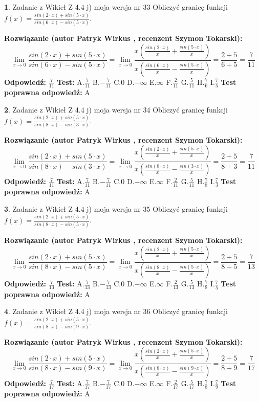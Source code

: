 \documentclass[12pt, a4paper]{article}
\theoremstyle{definition} %
\newtheorem{zad}{}
\newcommand{\zadStart}[1]{\begin{zad}#1\newline}
\newcommand{\zadStop}{\end{zad}}
\newcommand{\rozwStart}[2]{\noindent \textbf{Rozwiązanie (autor #1 , recenzent #2): }\newline}
\newcommand{\rozwStop}{\newline}
\newcommand{\odpStart}{\noindent \textbf{Odpowiedź:}\newline}
\newcommand{\odpStop}{\newline}
\newcommand{\testStart}{\noindent \textbf{Test:}\newline}
\newcommand{\testStop}{\newline}
\newcommand{\kluczStart}{\noindent \textbf{Test poprawna odpowiedź:}\newline}
\newcommand{\kluczStop}{\newline}
\begin{document}
\zadStart{Zadanie z Wikieł Z 4.4 j) moja wersja nr 33}
Obliczyć granicę funkcji $f(x)=\frac{sin(2\cdot x) +sin(5\cdot x)}{sin(6\cdot x) -sin(5\cdot x)}$.
\zadStop
\rozwStart{Patryk Wirkus}{Szymon Tokarski}
$$\lim\limits_{x\to 0}\frac{sin(2\cdot x) +sin(5\cdot x)}{sin(6\cdot x) -sin(5\cdot x)}=\lim\limits_{x\to 0}\frac{x(\frac{sin(2\cdot x)}{x}+\frac{sin(5\cdot x)}{x})}{x(\frac{sin(6\cdot x)}{x}-\frac{sin(5\cdot x)}{x})}=\frac{2+5}{6+5} = \frac{7}{11}$$
\rozwStop
\odpStart
$\frac{7}{11}$
\odpStop
\testStart
A.$\frac{7}{11}$
B.$-\frac{7}{11}$
C.$0$
D.$-\infty$
E.$\infty$
F.$\frac{2}{11}$
G.$\frac{5}{11}$
H.$\frac{7}{6}$
I.$\frac{7}{5}$
\testStop
\kluczStart
A
\kluczStop



\zadStart{Zadanie z Wikieł Z 4.4 j) moja wersja nr 34}
Obliczyć granicę funkcji $f(x)=\frac{sin(2\cdot x) +sin(5\cdot x)}{sin(8\cdot x) -sin(3\cdot x)}$.
\zadStop
\rozwStart{Patryk Wirkus}{Szymon Tokarski}
$$\lim\limits_{x\to 0}\frac{sin(2\cdot x) +sin(5\cdot x)}{sin(8\cdot x) -sin(3\cdot x)}=\lim\limits_{x\to 0}\frac{x(\frac{sin(2\cdot x)}{x}+\frac{sin(5\cdot x)}{x})}{x(\frac{sin(8\cdot x)}{x}-\frac{sin(3\cdot x)}{x})}=\frac{2+5}{8+3} = \frac{7}{11}$$
\rozwStop
\odpStart
$\frac{7}{11}$
\odpStop
\testStart
A.$\frac{7}{11}$
B.$-\frac{7}{11}$
C.$0$
D.$-\infty$
E.$\infty$
F.$\frac{2}{11}$
G.$\frac{5}{11}$
H.$\frac{7}{8}$
I.$\frac{7}{3}$
\testStop
\kluczStart
A
\kluczStop



\zadStart{Zadanie z Wikieł Z 4.4 j) moja wersja nr 35}
Obliczyć granicę funkcji $f(x)=\frac{sin(2\cdot x) +sin(5\cdot x)}{sin(8\cdot x) -sin(5\cdot x)}$.
\zadStop
\rozwStart{Patryk Wirkus}{Szymon Tokarski}
$$\lim\limits_{x\to 0}\frac{sin(2\cdot x) +sin(5\cdot x)}{sin(8\cdot x) -sin(5\cdot x)}=\lim\limits_{x\to 0}\frac{x(\frac{sin(2\cdot x)}{x}+\frac{sin(5\cdot x)}{x})}{x(\frac{sin(8\cdot x)}{x}-\frac{sin(5\cdot x)}{x})}=\frac{2+5}{8+5} = \frac{7}{13}$$
\rozwStop
\odpStart
$\frac{7}{13}$
\odpStop
\testStart
A.$\frac{7}{13}$
B.$-\frac{7}{13}$
C.$0$
D.$-\infty$
E.$\infty$
F.$\frac{2}{13}$
G.$\frac{5}{13}$
H.$\frac{7}{8}$
I.$\frac{7}{5}$
\testStop
\kluczStart
A
\kluczStop



\zadStart{Zadanie z Wikieł Z 4.4 j) moja wersja nr 36}
Obliczyć granicę funkcji $f(x)=\frac{sin(2\cdot x) +sin(5\cdot x)}{sin(8\cdot x) -sin(9\cdot x)}$.
\zadStop
\rozwStart{Patryk Wirkus}{Szymon Tokarski}
$$\lim\limits_{x\to 0}\frac{sin(2\cdot x) +sin(5\cdot x)}{sin(8\cdot x) -sin(9\cdot x)}=\lim\limits_{x\to 0}\frac{x(\frac{sin(2\cdot x)}{x}+\frac{sin(5\cdot x)}{x})}{x(\frac{sin(8\cdot x)}{x}-\frac{sin(9\cdot x)}{x})}=\frac{2+5}{8+9} = \frac{7}{17}$$
\rozwStop
\odpStart
$\frac{7}{17}$
\odpStop
\testStart
A.$\frac{7}{17}$
B.$-\frac{7}{17}$
C.$0$
D.$-\infty$
E.$\infty$
F.$\frac{2}{17}$
G.$\frac{5}{17}$
H.$\frac{7}{8}$
I.$\frac{7}{9}$
\testStop
\kluczStart
A
\kluczStop
\end{document}
